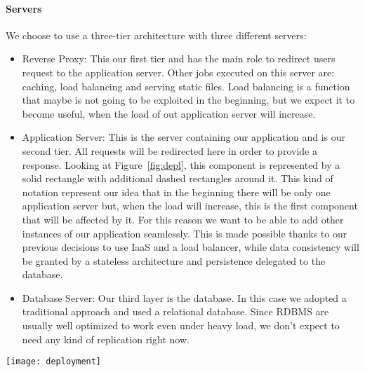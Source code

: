 \paragraph{Servers} We choose to use a three-tier architecture with three different servers:
\begin{itemize}
    \item{Reverse Proxy}: This our first tier and has the main role to redirect users request to
        the application server. Other jobs executed on this server are: caching, load balancing
        and serving static files.
        Load balancing is a function that maybe is not going to be exploited in the beginning,
        but we expect it to become useful, when the load of out application server will increase.

    \item{Application Server}: This is the server containing our application and is our second tier.
        All requests will be redirected here in order to provide a response. Looking at
        Figure~\ref{fig:depl}, this component is represented by a solid rectangle with additional
        dashed rectangles around it. This kind of notation represent our idea that in the
        beginning there will be only one application server but, when the load will increase,
        this is the first component that will be affected by it. For this reason we want to
        be able to add other instances of our application seamlessly. This is made possible
        thanks to our previous decisions to use IaaS and a load balancer, while data consistency
        will be granted by a stateless architecture and persistence delegated to the database.

    \item{Database Server}: Our third layer is the database. In this case we adopted a
        traditional approach and used a relational database. Since RDBMS are usually well
        optimized to work even under heavy load, we don't expect to need any kind of
        replication right now.

\end{itemize}
\begin{sidewaysfigure}
\centering
\texttt{[image: deployment]}
\caption{Deployment view}
\label{fig:depl}
\end{sidewaysfigure}


